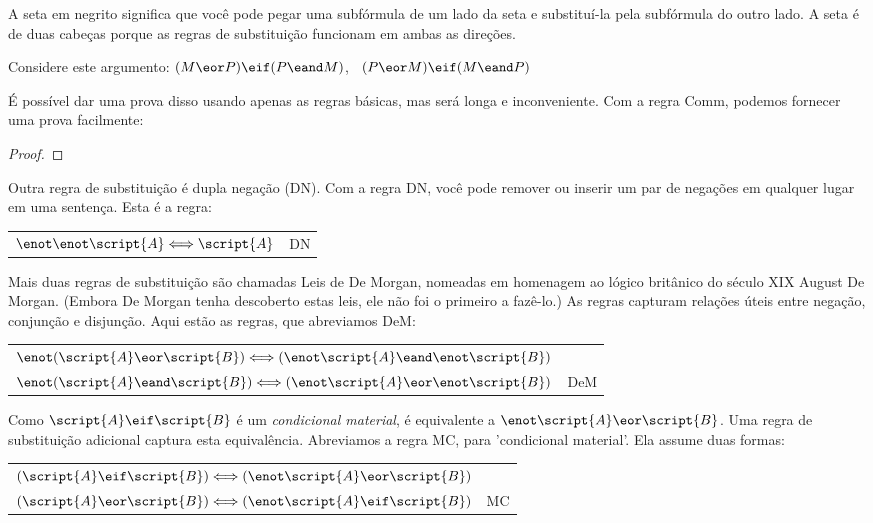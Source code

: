 A seta em negrito significa que você pode pegar uma subfórmula de um lado da seta e substituí-la pela subfórmula do outro lado. A seta é de duas cabeças porque as regras de substituição funcionam em ambas as direções.

Considere este argumento: $(M \eor P) \eif (P \eand M)$, \therefore\ $(P \eor M) \eif (M \eand P)$

É possível dar uma prova disso usando apenas as regras básicas, mas será longa e inconveniente. Com a regra Comm, podemos fornecer uma prova facilmente:

\begin{proof}
\end{proof}

Outra regra de substituição é dupla negação (DN). Com a regra DN, você pode remover ou inserir um par de negações em qualquer lugar em uma sentença. Esta é a regra:

\begin{center}
\begin{tabular}{rl}
$\enot\enot\script{A} \Longleftrightarrow \script{A}$ & DN
\end{tabular}
\end{center}

Mais duas regras de substituição são chamadas Leis de De Morgan, nomeadas em homenagem ao lógico britânico do século XIX August De Morgan. (Embora De Morgan tenha descoberto estas leis, ele não foi o primeiro a fazê-lo.) As regras capturam relações úteis entre negação, conjunção e disjunção. Aqui estão as regras, que abreviamos DeM:

\begin{center}
\begin{tabular}{rl}
$\enot(\script{A}\eor\script{B}) \Longleftrightarrow (\enot\script{A}\eand\enot\script{B})$\\
$\enot(\script{A}\eand\script{B}) \Longleftrightarrow (\enot\script{A}\eor\enot\script{B})$
& DeM
\end{tabular}
\end{center}

Como $\script{A}\eif\script{B}$ é um \emph{condicional material}, é equivalente a $\enot\script{A}\eor\script{B}$. Uma regra de substituição adicional captura esta equivalência. Abreviamos a regra MC, para 'condicional material'. Ela assume duas formas:

\begin{center}
\begin{tabular}{rl}
$(\script{A}\eif\script{B}) \Longleftrightarrow (\enot\script{A}\eor\script{B})$ &\\
$(\script{A}\eor\script{B}) \Longleftrightarrow (\enot\script{A}\eif\script{B})$ & MC
\end{tabular}
\end{center}


